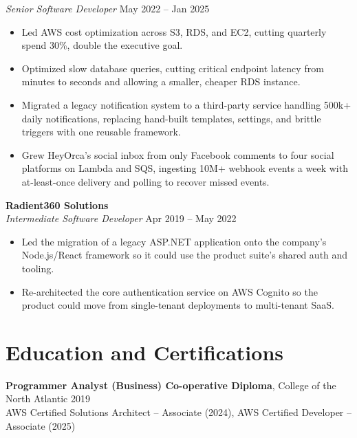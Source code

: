 \documentclass[11pt]{article}
\begin{document}
\vspace{3pt}
\textit{Senior Software Developer} \hfill May 2022 -- Jan 2025
\begin{itemize}
    \item Led AWS cost optimization across S3, RDS, and EC2, cutting quarterly spend 30\%, double the executive goal.
    \item Optimized slow database queries, cutting critical endpoint latency from minutes to seconds and allowing a smaller, cheaper RDS instance.
    \item Migrated a legacy notification system to a third-party service handling 500k+ daily notifications, replacing hand-built templates, settings, and brittle triggers with one reusable framework.
    \item Grew HeyOrca's social inbox from only Facebook comments to four social platforms on Lambda and SQS, ingesting 10M+ webhook events a week with at-least-once delivery and polling to recover missed events.
\end{itemize}

\vspace{6pt}

\textbf{Radient360 Solutions} \\
\textit{Intermediate Software Developer} \hfill Apr 2019 -- May 2022
\begin{itemize}
    \item Led the migration of a legacy ASP.NET application onto the company's Node.js/React framework so it could use the product suite's shared auth and tooling.
    \item Re-architected the core authentication service on AWS Cognito so the product could move from single-tenant deployments to multi-tenant SaaS.
\end{itemize}

\section*{Education and Certifications}
\textbf{Programmer Analyst (Business) Co-operative Diploma}, College of the North Atlantic \hfill 2019 \\
AWS Certified Solutions Architect – Associate (2024), AWS Certified Developer – Associate (2025)
\end{document}
